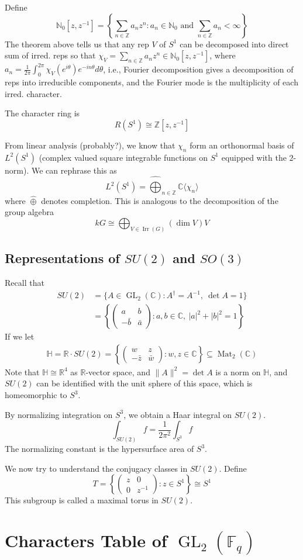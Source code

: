 \documentclass{article}
\theoremstyle{definition}
\theoremstyle{remark}
\theoremstyle{plain}
\newcommand{\NN}{\mathbb{N}}
\newcommand{\ZZ}{\mathbb{Z}}
\newcommand{\RR}{\mathbb{R}}
\newcommand{\CC}{\mathbb{C}}
\newcommand{\FF}{\mathbb{F}}
\begin{document}
Define 
\[\NN_0[z,z^{-1}]=\left\{\sum_{n\in\ZZ}a_nz^n:a_n\in\NN_0\text{ and }\sum_{n\in\ZZ}a_n<\infty\right\}\]
The theorem above tells us that any rep $V$ of $S^1$ can be decomposed into direct sum of irred. reps so that $\chi_V=\sum_{n\in\ZZ}a_nz^n\in\NN_0[z,z^{-1}]$, where $a_n=\frac{1}{2\pi}\int_0^{2\pi}\chi_V(e^{i\theta})e^{-in\theta}d\theta$, i.e., Fourier decomposition gives a decomposition of reps into irreducible components, and the Fourier mode is the multiplicity of each irred. character.

The character ring is 
\[R(S^1)\cong \ZZ[z,z^{-1}]\]

From linear analysis (probably?), we know that $\chi_n$ form an orthonormal basis of $L^2(S^1)$ (complex valued square integrable functions on $S^1$ equipped with the $2$-norm). We can rephrase this as 
\[L^2(S^1)=\hat\bigoplus_{n\in\ZZ}\CC\langle\chi_n\rangle\]
where $\hat\oplus$ denotes completion. This is analogous to the decomposition of the group algebra
\[kG\cong \bigoplus_{V\in\operatorname{Irr}(G)}(\dim V)V\]

\subsection{Representations of $SU(2)$ and $SO(3)$}

Recall that
\begin{align*}SU(2)&=\{A\in\operatorname{GL}_2(\CC):A^\dagger=A^{-1},\ \det A=1\}\\
&=\left\{\begin{pmatrix}
    a&b\\
    -\bar b&\bar a
\end{pmatrix}:a,b\in\CC,\ |a|^2+|b|^2=1\right\}
\end{align*}
If we let
\begin{align*}
    \mathbb H=\RR\cdot SU(2)=\left\{\begin{pmatrix}
        w&z\\ -\bar z&\bar w
    \end{pmatrix}:w,z\in\CC\right\}\subseteq \operatorname{Mat}_2(\CC)
\end{align*}
Note that $\mathbb H\cong\RR^4$ as $\RR$-vector space, and $\|A\|^2=\det A$ is a norm on $\mathbb H$, and $SU(2)$ can be identified with the unit sphere of this space, which is homeomorphic to $S^3$.

By normalizing integration on $S^3$, we obtain a Haar integral on $SU(2)$.
\[\int_{SU(2)}f=\dfrac{1}{2\pi^2}\int_{S^3}f\]
The normalizing constant is the hypersurface area of $S^3$.

We now try to understand the conjugacy classes in $SU(2)$.
Define 
\[T=\left\{\begin{pmatrix}
    z&0\\0&z^{-1}
\end{pmatrix}:z\in S^1\right\}\cong S^1\]
This subgroup is called a maximal torus in $SU(2)$.

\section{Characters Table of $\operatorname{GL}_2(\FF_q)$}
\end{document}
